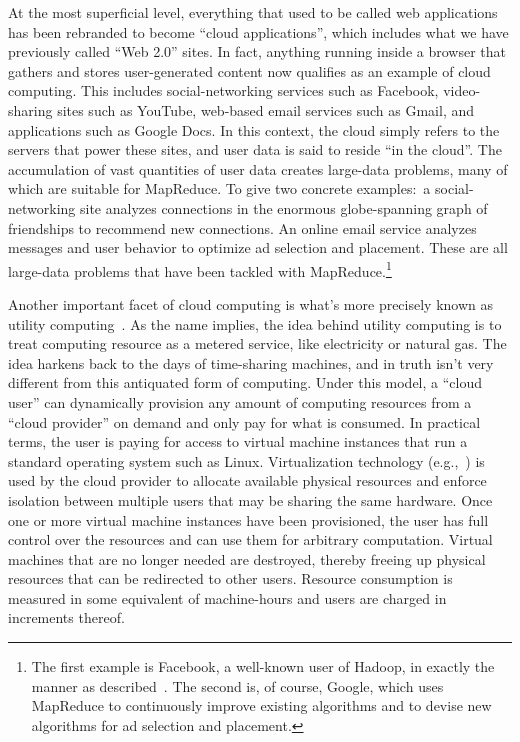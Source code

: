 At the most superficial level, everything that used to be called web
applications has been rebranded to become ``cloud applications'',
which includes what we have previously called ``Web 2.0'' sites.  In
fact, anything running inside a browser that gathers and stores
user-generated content now qualifies as an example of cloud computing.
This includes social-networking services such as Facebook,
video-sharing sites such as YouTube, web-based email services such as
Gmail, and applications such as Google Docs.  In this context, the
cloud simply refers to the servers that power these sites, and user
data is said to reside ``in the cloud''.  The accumulation of vast
quantities of user data creates large-data problems, many of which are
suitable for MapReduce.  To give two concrete examples:\ a
social-networking site analyzes connections in the enormous
globe-spanning graph of friendships to recommend new connections.  An
online email service analyzes messages and user behavior to optimize
ad selection and placement.  These are all large-data problems that
have been tackled with MapReduce.\footnote{The first example is
  Facebook, a well-known user of Hadoop, in exactly the manner as
  described~\cite{Hammerbacher_2009}.  The second is, of course,
  Google, which uses MapReduce to continuously improve existing
  algorithms and to devise new algorithms for ad selection and
  placement.}

Another important facet of cloud computing is what's more precisely
known as utility computing~\cite{Rappa_2004,Buyya_etal_2009}.  As the
name implies, the idea behind utility computing is to treat computing
resource as a metered service, like electricity or natural gas.  The
idea harkens back to the days of time-sharing machines, and in truth
isn't very different from this antiquated form of computing.  Under
this model, a ``cloud user'' can dynamically provision any amount of
computing resources from a ``cloud provider'' on demand and only pay
for what is consumed.  In practical terms, the user is paying for
access to virtual machine instances that run a standard operating
system such as Linux.  Virtualization technology
(e.g.,~\cite{Barham_etal_2003}) is used by the cloud provider to
allocate available physical resources and enforce isolation between
multiple users that may be sharing the same hardware.  Once one or
more virtual machine instances have been provisioned, the user has
full control over the resources and can use them for arbitrary
computation.  Virtual machines that are no longer needed are
destroyed, thereby freeing up physical resources that can be
redirected to other users.  Resource consumption is measured in some
equivalent of machine-hours and users are charged in increments
thereof.

